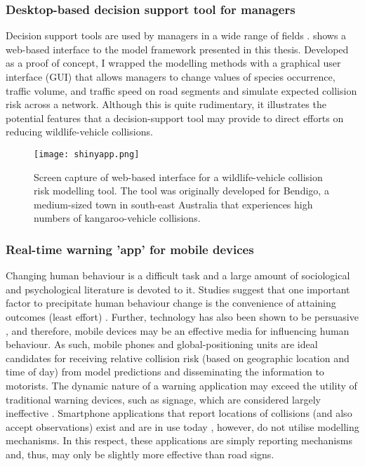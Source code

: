 \subsubsection{Desktop-based decision support tool for managers}

Decision support tools are used by managers in a wide range of fields \citep{shim02}.  shows a web-based interface to the model framework presented in this thesis. Developed as a proof of concept, I wrapped the modelling methods with a graphical user interface (GUI) that allows managers to change values of species occurrence, traffic volume, and traffic speed on road segments and simulate expected collision risk across a network. Although this is quite rudimentary, it illustrates the potential features that a decision-support tool may provide to direct efforts on reducing wildlife-vehicle collisions.

\begin{figure*}[htp]
  \centering
  \texttt{[image: shinyapp.png]}
  \caption[Decision support tool for wildlife-vehicle collisions]{Screen capture of web-based interface for a wildlife-vehicle collision risk modelling tool. The tool was originally developed for Bendigo, a medium-sized town in south-east Australia that experiences high numbers of kangaroo-vehicle collisions.}
  \label{wvc_tool}
\end{figure*}

\subsubsection{Real-time warning 'app' for mobile devices}

Changing human behaviour is a difficult task and a large amount of sociological and psychological literature is devoted to it. Studies suggest that one important factor to precipitate human behaviour change is the convenience of attaining outcomes (least effort) \citep{zipf49}. Further, technology has also been shown to be persuasive \citep{fogg02,lath13}, and therefore, mobile devices may be an effective media for influencing human behaviour. As such, mobile phones and global-positioning units are ideal candidates for receiving relative collision risk (based on geographic location and time of day) from model predictions and disseminating the information to motorists. The dynamic nature of a warning application may exceed the utility of traditional warning devices, such as signage, which are considered largely ineffective \citep{bond13}.  Smartphone applications that report locations of collisions (and also accept observations) exist and are in use today \citep{aane09}, however, do not utilise modelling mechanisms. In this respect, these applications are simply reporting mechanisms and, thus, may only be slightly more effective than road signs.  

